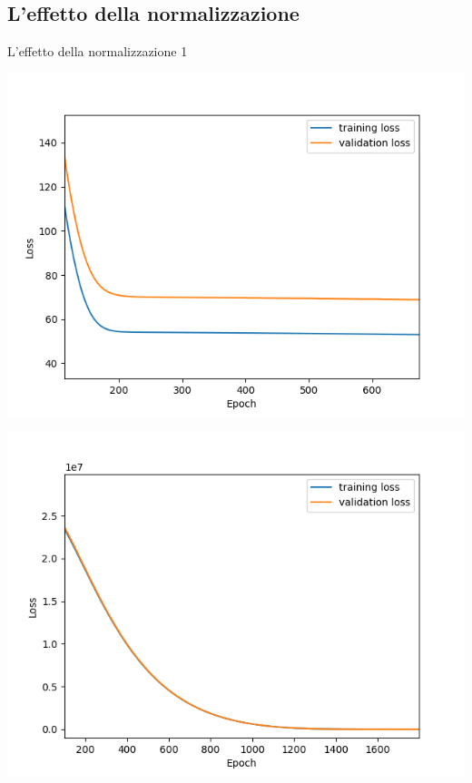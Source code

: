 \documentclass{beamer}
\begin{document}
\subsection{L'effetto della normalizzazione}
\begin{frame}{L'effetto della normalizzazione 1}
\centering
\begin{minipage}{0.48\textwidth}
	\includegraphics[width=\textwidth]{Figure_2.png}
	\label{historyNormalised}
\end{minipage}
\begin{minipage}{0.48\textwidth}
	\includegraphics[width=\textwidth]{History_subplot_1.png}
	\label{historyNonNormalised}
\end{minipage}

\end{frame}
\end{document}
